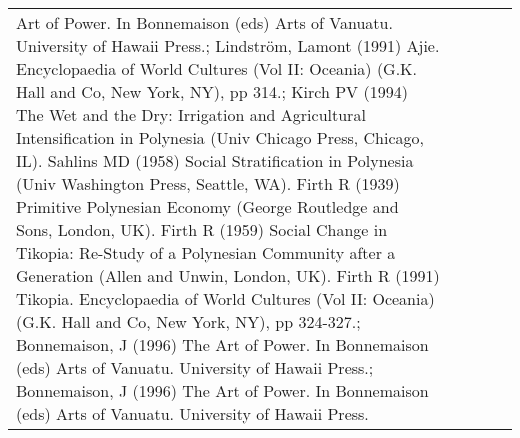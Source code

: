 \begin{longtable}{p{1.8cm}p{1.8cm}p{1.8cm}p{2cm}p{7cm}}
Art of Power. In Bonnemaison (eds) Arts of Vanuatu. University of Hawaii Press.; Lindström, Lamont (1991) Ajie. Encyclopaedia of World Cultures (Vol II: Oceania) (G.K. Hall and Co, New York, NY), pp 314.; Kirch PV (1994) The Wet and the Dry: Irrigation and Agricultural Intensification in Polynesia (Univ Chicago Press, Chicago, IL). Sahlins MD (1958) Social Stratification in Polynesia (Univ Washington Press, Seattle, WA). Firth R (1939) Primitive Polynesian Economy (George Routledge and Sons, London, UK). Firth R (1959) Social Change in Tikopia: Re-Study of a Polynesian Community after a Generation (Allen and Unwin, London, UK). Firth R (1991) Tikopia. Encyclopaedia of World Cultures (Vol II: Oceania) (G.K. Hall and Co, New York, NY), pp 324-327.; Bonnemaison, J (1996) The Art of Power. In Bonnemaison (eds) Arts of Vanuatu. University of Hawaii Press.; Bonnemaison, J (1996) The Art of Power. In Bonnemaison (eds) Arts of Vanuatu. University of Hawaii Press. \\ 

\end{longtable}
